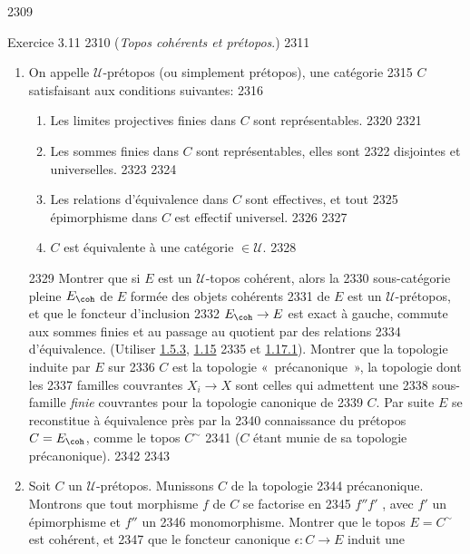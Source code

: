   2309	\begin{enonce*}[remark]{Exercice 3.11}
  2310	(\emph{Topos cohérents et prétopos}.)
  2311	\begin{enumerate}
  2312	\renewcommand{\theenumi}{\alph {enumi}}
  2313	\renewcommand{\labelenumi}{\theenumi)}
  2314	\item On appelle $𝒰$-prétopos (ou simplement prétopos), une catégorie
  2315	  $C$ satisfaisant aux conditions suivantes:
  2316	\begin{enumerate}
  2317	\renewcommand{\theenumii}{\arabic{enumii}}
  2318	\renewcommand{\labelenumii}{\theenumii)}
  2319	\item Les limites projectives finies dans $C$ sont représentables.
  2320	
  2321	\item Les sommes finies dans $C$ sont représentables, elles sont
  2322	  disjointes et universelles.
  2323	
  2324	\item Les relations d'équivalence dans $C$ sont effectives, et tout
  2325	  épimorphisme dans $C$ est effectif universel.
  2326	
  2327	\item $C$ est équivalente à une catégorie $\in 𝒰$.
  2328	\end{enumerate}
  2329	Montrer que si $E$ est un $𝒰$-topos cohérent, alors la
  2330	sous-catégorie pleine $E_{\coh}$ de $E$ formée des objets cohérents
  2331	de $E$ est un $𝒰$-prétopos, et que le foncteur d'inclusion
  2332	$E_{\coh} \to E$ est exact à gauche, commute aux	sommes finies et au passage au quotient par des relations
  2334	d'équivalence. (Utiliser \hyperref[VI.subsubsec1.5.3]{1.5.3}, \hyperref[VI.cor1.15]{1.15}
  2335	et \hyperref[VI.cor1.17.1]{1.17.1}). Montrer que la topologie induite par $E$ sur
  2336	$C$ est la topologie « précanonique », \ie la topologie dont les
  2337	familles couvrantes $X_i \to X$ sont celles qui admettent une
  2338	sous-famille \emph{finie} couvrantes pour la topologie canonique de
  2339	$C$. Par suite $E$ se reconstitue à équivalence près par la
  2340	connaissance du prétopos $C = E_{\coh}$, comme le topos $C^{\sim}$
  2341	($C$ étant munie de sa topologie précanonique).
  2342	
  2343	\item Soit $C$ un $𝒰$-prétopos. Munissons $C$ de la topologie
  2344	  précanonique. Montrons que tout morphisme $f$ de $C$ se factorise en
  2345	  $f'' f'$ , avec $f'$ un épimorphisme et $f''$ un
  2346	  monomorphisme. Montrer que le topos $E = C^{\sim}$ est cohérent, et
  2347	  que le foncteur canonique $\epsilon : C \to E$ induit une

\end{enumerate}
\end{enonce*}
